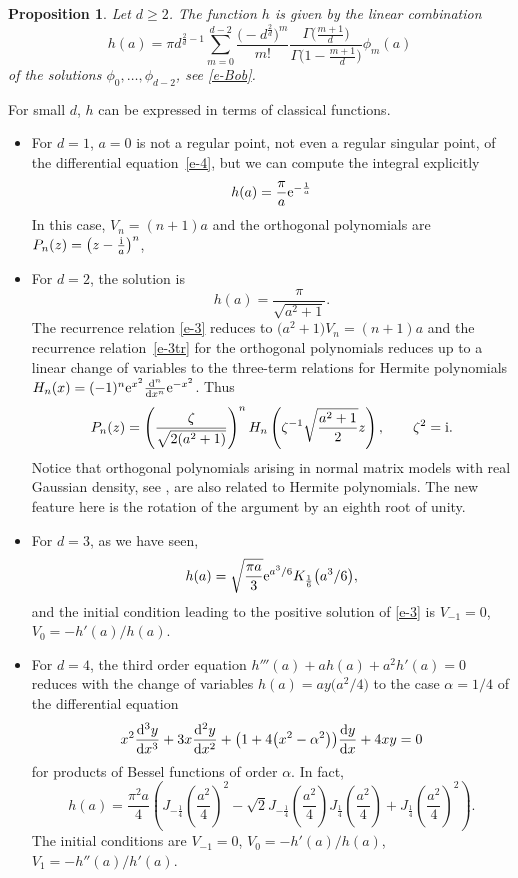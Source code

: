 \documentclass[10pt,a4paper]{amsart}
\numberwithin{equation}{section}
\newtheorem{Proposition}[Theorem]{Proposition}
\theoremstyle{definition}
\begin{document}
\begin{Proposition} Let $d\geq2$. The function $h$ is given by the linear combination
\[
 h(a)=\pi d^{\frac2d-1}\sum_{m=0}^{d-2}\frac{\bigl(-d^{\frac2d}\bigr)^m}{m!}
 \frac{\Gamma\bigl(\frac{m+1}d\bigr)}
 {\Gamma\bigl(1-\frac{m+1}{d}\bigr)}\phi_m(a)
\]
of the solutions $\phi_0,\dots,\phi_{d-2}$, see \eqref{e-Bob}.
\end{Proposition}
For small $d$, $h$ can be expressed in terms of classical functions.
\begin{itemize}\itemsep=0pt
 \item
 For $d=1$, $a=0$ is not a regular point, not even a regular singular point, of the
 differential equation~\eqref{e-4}, but we can compute the integral explicitly
\[
h(a)=\frac{\pi}a{\rm e}^{-\frac1a}
\]
In this case, $V_n=(n+1)a$ and the orthogonal polynomials are $P_n(z)=\left(z-\frac {\rm i}a\right)^n$,
\item
For $d=2$, the solution is
\[
h(a)=\frac\pi{\sqrt{a^2+1}}.
\]
The recurrence relation \eqref{e-3} reduces to $\big(a^2+1\big)V_n=(n+1)a$ and the recurrence relation~\eqref{e-3tr} for the orthogonal polynomials reduces up to a linear change of variables to the three-term relations for Hermite polynomials $H_{n}(x)=(-1)^n{\rm e}^{x^2}\frac{{\rm d}^n}{{\rm d}x^n}{\rm e}^{-x^2}$. Thus
\[
P_n(z)=\left(\frac\zeta{\sqrt{2(a^2+1)}}\right)^nH_n\left(\zeta^{-1}\sqrt{\frac {a^2+1}2}z\right),\qquad \zeta^2={\rm i}.
\]
Notice that orthogonal polynomials arising in normal matrix models with real Gaussian density, see \cite{Riser2013}, are also related to Hermite polynomials. The new feature here is the rotation of the argument by an eighth root of unity.
\item
For $d=3$, as we have seen,
\[
 h(a)=\sqrt{\frac {\pi a}3} {\rm e}^{a^3/6}K_{\frac16}\bigl(a^3/6\bigr),
\]
and the initial condition leading to the positive solution of \eqref{e-3} is $V_{-1}=0$, $V_{0}=-h'(a)/h(a)$.
\item
 For $d=4$, the third order equation $h'''(a)+ah(a)+a^2h'(a)=0$ reduces with the
 change of variables $h(a)=ay\bigl(a^2/4\bigr)$ to the case $\alpha=1/4$ of the differential equation
 \[
 x^2\frac{{\rm d}^3y}{{\rm d}x^3}+3x\frac{{\rm d}^2y}{{\rm d}x^2}+\bigl(1+4\bigl(x^2-\alpha^2\bigr)\bigr)\frac{{\rm d}y}{{\rm d}x}+4x y=0
 \]
 for products of Bessel functions of order $\alpha$. In fact,
\[
 h(a)=\frac{\pi^2a}4\left(J_{-\frac14}\left({\frac{a^2}4}\right)^2
 -\sqrt2J_{-\frac14}\left({\frac{a^2}4}\right)J_{\frac14}\left({\frac{a^2}4}\right)
 +J_{\frac14}\left({\frac{a^2}4}\right)^2
 \right).
\]
The initial conditions are $V_{-1}=0$, $V_0=-h'(a)/h(a)$, $V_1=-h''(a)/h'(a)$.
\end{itemize}
\end{document}
